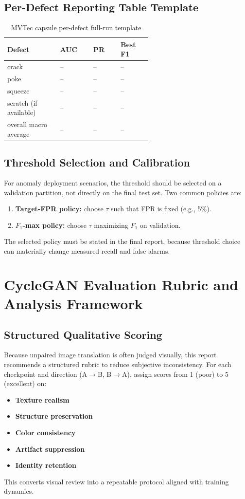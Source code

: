 \documentclass[conference]{IEEEtran}
\begin{document}
\subsection{Per-Defect Reporting Table Template}
\begin{table}[!t]
\centering
\small
\caption{MVTec capsule per-defect full-run template}
\begin{tabular}{|p{0.23\linewidth}|p{0.12\linewidth}|p{0.12\linewidth}|p{0.12\linewidth}|}
\hline
\textbf{Defect} & \textbf{AUC} & \textbf{PR} & \textbf{Best F1} \\
\hline
crack & -- & -- & -- \\
\hline
poke & -- & -- & -- \\
\hline
squeeze & -- & -- & -- \\
\hline
scratch (if available) & -- & -- & -- \\
\hline
overall macro average & -- & -- & -- \\
\hline
\end{tabular}
\end{table}

\subsection{Threshold Selection and Calibration}
For anomaly deployment scenarios, the threshold should be selected on a validation partition, not directly on the final test set. Two common policies are:
\begin{enumerate}
\item \textbf{Target-FPR policy:} choose $\tau$ such that FPR is fixed (e.g., 5\%).
\item \textbf{$F_1$-max policy:} choose $\tau$ maximizing $F_1$ on validation.
\end{enumerate}
The selected policy must be stated in the final report, because threshold choice can materially change measured recall and false alarms.

\section{CycleGAN Evaluation Rubric and Analysis Framework}
\subsection{Structured Qualitative Scoring}
Because unpaired image translation is often judged visually, this report recommends a structured rubric to reduce subjective inconsistency. For each checkpoint and direction (A$\to$B, B$\to$A), assign scores from 1 (poor) to 5 (excellent) on:
\begin{itemize}
\item \textbf{Texture realism}
\item \textbf{Structure preservation}
\item \textbf{Color consistency}
\item \textbf{Artifact suppression}
\item \textbf{Identity retention}
\end{itemize}
This converts visual review into a repeatable protocol aligned with training dynamics.
\end{document}
